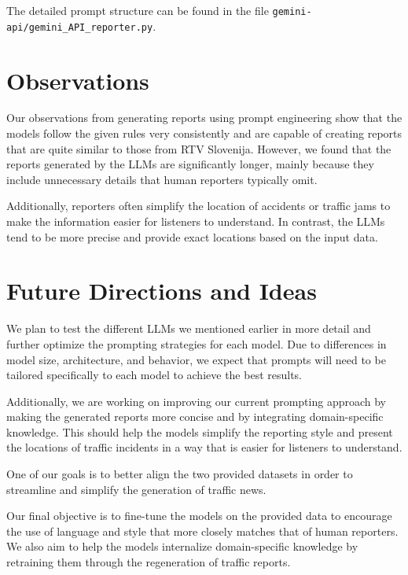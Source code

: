 \documentclass[fleqn,moreauthors,10pt]{ds_report}
\begin{document}
The detailed prompt structure can be found in the file \texttt{gemini-api/gemini\_API\_reporter.py}.

\section*{Observations}

Our observations from generating reports using prompt engineering show that the models follow the given rules very consistently and are capable of creating reports that are quite similar to those from RTV Slovenija. However, we found that the reports generated by the LLMs are significantly longer, mainly because they include unnecessary details that human reporters typically omit. 

Additionally, reporters often simplify the location of accidents or traffic jams to make the information easier for listeners to understand. In contrast, the LLMs tend to be more precise and provide exact locations based on the input data.

\section*{Future Directions and Ideas}

We plan to test the different LLMs we mentioned earlier in more detail and further optimize the prompting strategies for each model. Due to differences in model size, architecture, and behavior, we expect that prompts will need to be tailored specifically to each model to achieve the best results.

Additionally, we are working on improving our current prompting approach by making the generated reports more concise and by integrating domain-specific knowledge. This should help the models simplify the reporting style and present the locations of traffic incidents in a way that is easier for listeners to understand.

One of our goals is to better align the two provided datasets in order to streamline and simplify the generation of traffic news.

Our final objective is to fine-tune the models on the provided data to encourage the use of language and style that more closely matches that of human reporters. We also aim to help the models internalize domain-specific knowledge by retraining them through the regeneration of traffic reports.


\end{document}
